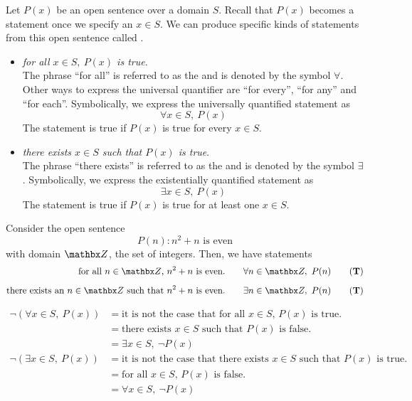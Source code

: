 \begin{discussion}[Quantifiers]
Let $P(x)$ be an open sentence over a domain $S$. Recall that $P(x)$ becomes a statement once we specify an $x \in S$. We can produce specific kinds of statements from this open sentence called .
\begin{itemize}[itemsep=1em]
\item \emph{for all $x \in S,\ P(x)$ is true}.\\[0.5em]
The phrase ``for all'' is referred to as the  and is denoted by the symbol $\forall$. Other ways to express the universal quantifier are ``for every'', ``for any'' and ``for each''. Symbolically, we express the universally quantified statement as
\[\forall x \in S,\ P(x)\]
The statement is true if $P(x)$ is true for every $x \in S$.

\item \emph{there exists $x \in S$ such that $P(x)$ is true}.\\[0.5em]
The phrase ``there exists'' is referred to as the  and is denoted by the symbol $\exists$. Symbolically, we express the existentially quantified statement as
\[\exists x \in S,\ P(x)\]
The statement is true if $P(x)$ is true for at least one $x \in S$.
\end{itemize}
\end{discussion}

\vspace*{1em}

\begin{example}
Consider the open sentence
\[P(n):n^2 + n \text{ is even}\]
with domain $\zz$, the set of integers. Then, we have statements
\begin{align*}
\text{for all $n \in \zz$, $n^2 + n$ is even.}&\qquad \forall n \in \zz,\ P(n) \qquad (\true)\\[0.5em]
\text{there exists an $n \in \zz$ such that $n^2 + n$ is even.}&\qquad \exists n \in \zz,\ P(n) \qquad (\true)
\end{align*}
\end{example}

\vspace*{1em}

\begin{discussion}\hfill
\begin{align*}
\neg (\forall x\in S,\ P(x)) &= \text{it is not the case that for all $x \in S$, $P(x)$ is true.}\\[0.5em]
 &= \text{there exists $x \in S$ such that $P(x)$ is false.}\\[0.5em]
 &= \exists x\in S,\ \neg P(x)\\[1em]
 \neg (\exists x\in S,\ P(x)) &= \text{it is not the case that there exists $x \in S$ such that $P(x)$ is true.}\\[0.5em]
 &= \text{for all $x \in S$, $P(x)$ is false.}\\[0.5em]
 &= \forall x\in S,\ \neg P(x)
\end{align*}
\end{discussion}


